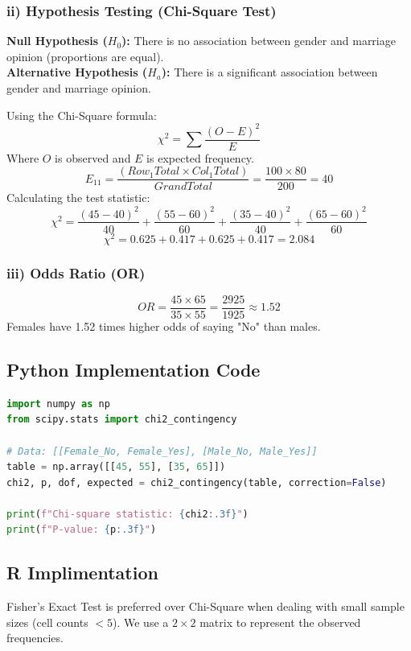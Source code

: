 \documentclass[12pt]{article}
\begin{document}
\subsubsection{ii) Hypothesis Testing (Chi-Square Test)}
\textbf{Null Hypothesis ($H_0$):} There is no association between gender and marriage opinion (proportions are equal). \\
\textbf{Alternative Hypothesis ($H_a$):} There is a significant association between gender and marriage opinion.

Using the Chi-Square formula:
\[ \chi^2 = \sum \frac{(O - E)^2}{E} \]
Where $O$ is observed and $E$ is expected frequency.
\[ E_{11} = \frac{(Row_1 Total \times Col_1 Total)}{Grand Total} = \frac{100 \times 80}{200} = 40 \]
Calculating the test statistic:
\[ \chi^2 = \frac{(45-40)^2}{40} + \frac{(55-60)^2}{60} + \frac{(35-40)^2}{40} + \frac{(65-60)^2}{60} \]
\[ \chi^2 = 0.625 + 0.417 + 0.625 + 0.417 = 2.084 \]

\subsubsection{iii) Odds Ratio (OR)}
\[ OR = \frac{45 \times 65}{35 \times 55} = \frac{2925}{1925} \approx 1.52 \]
Females have 1.52 times higher odds of saying "No" than males.

\subsection{ Python Implementation Code}

\begin{lstlisting}[language=Python, caption=Python implementation for Marriage Opinion]
import numpy as np
from scipy.stats import chi2_contingency

# Data: [[Female_No, Female_Yes], [Male_No, Male_Yes]]
table = np.array([[45, 55], [35, 65]])
chi2, p, dof, expected = chi2_contingency(table, correction=False)

print(f"Chi-square statistic: {chi2:.3f}")
print(f"P-value: {p:.3f}")
\end{lstlisting}

\subsection{ R Implimentation}
Fisher's Exact Test is preferred over Chi-Square when dealing with small sample sizes (cell counts $< 5$). We use a $2 \times 2$ matrix to represent the observed frequencies.
\end{document}
